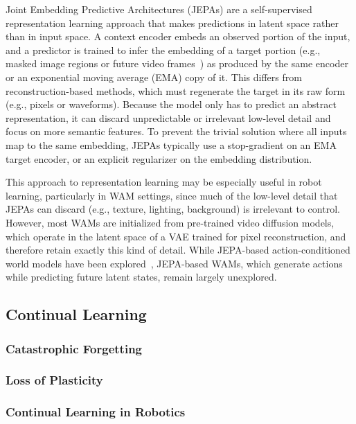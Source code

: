 Joint Embedding Predictive Architectures (JEPAs) are a self-supervised representation learning approach that makes predictions in latent space rather than in input space. A context encoder embeds an observed portion of the input, and a predictor is trained to infer the embedding of a target portion (e.g., masked image regions or future video frames~\citep{mur-labadia2026vjepa}) as produced by the same encoder or an exponential moving average (EMA) copy of it. This differs from reconstruction-based methods, which must regenerate the target in its raw form (e.g., pixels or waveforms). Because the model only has to predict an abstract representation, it can discard unpredictable or irrelevant low-level detail and focus on more semantic features. To prevent the trivial solution where all inputs map to the same embedding, JEPAs typically use a stop-gradient on an EMA target encoder, or an explicit regularizer on the embedding distribution.

This approach to representation learning may be especially useful in robot learning, particularly in WAM settings, since much of the low-level detail that JEPAs can discard (e.g., texture, lighting, background) is irrelevant to control. However, most WAMs are initialized from pre-trained video diffusion models, which operate in the latent space of a VAE trained for pixel reconstruction, and therefore retain exactly this kind of detail. While JEPA-based action-conditioned world models have been explored~\citep{wang2026adajepa, maes2026leworldmodel}, JEPA-based WAMs, which generate actions while predicting future latent states, remain largely unexplored.

\subsection{Continual Learning}

\subsubsection{Catastrophic Forgetting}


\subsubsection{Loss of Plasticity}

\subsubsection{Continual Learning in Robotics}
\citep{powers2023continual}
\cite{chen2026robot}

